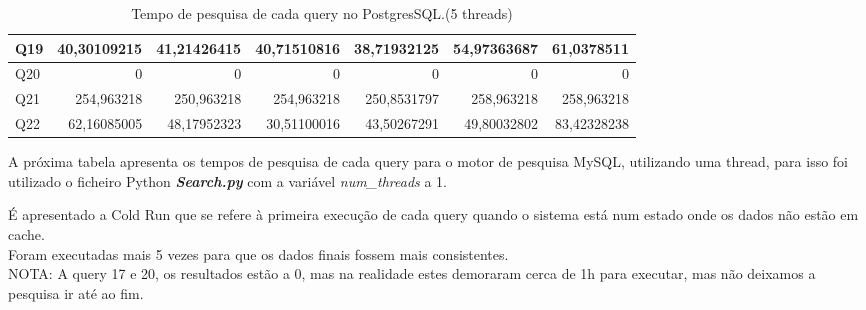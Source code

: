 \documentclass{article}
\begin{document}
\begin{table}[H]
{\begin{tabular}{|l|r|r|r|r|r|r|}
Q19&	40,30109215	&41,21426415&	40,71510816	&38,71932125&	54,97363687	&61,0378511\\ \hline
Q20&	0	& 0 & 	0 & 	0	& 0 & 	0\\ \hline
Q21&	254,963218	&250,963218	&254,963218	&250,8531797&	258,963218	&258,963218\\ \hline
Q22&	62,16085005	&48,17952323&	30,51100016	&43,50267291&	49,80032802	&83,42328238\\ \hline
    \end{tabular}}
    \caption{Tempo de pesquisa de cada query no PostgresSQL.(5 threads)}
    \label{tab:BC_Table6}
  \end{table}


  \clearpage

  \texttt{}\par A próxima tabela apresenta os tempos de pesquisa de cada query para o motor de pesquisa MySQL, utilizando uma thread, para isso foi utilizado o ficheiro Python \textbf{\textit{Search.py}}  com a variável \textit{num\_threads} a 1. 
  \texttt{}\par É apresentado a Cold Run que se refere à primeira execução de cada query quando o sistema está num estado onde os dados não estão em cache.\\
  Foram executadas mais 5 vezes para que os dados finais fossem mais consistentes.\\
  NOTA: A query 17 e 20, os resultados estão a 0, mas na realidade estes demoraram cerca de 1h para executar, mas não deixamos a pesquisa ir até ao fim.
  
\end{document}
